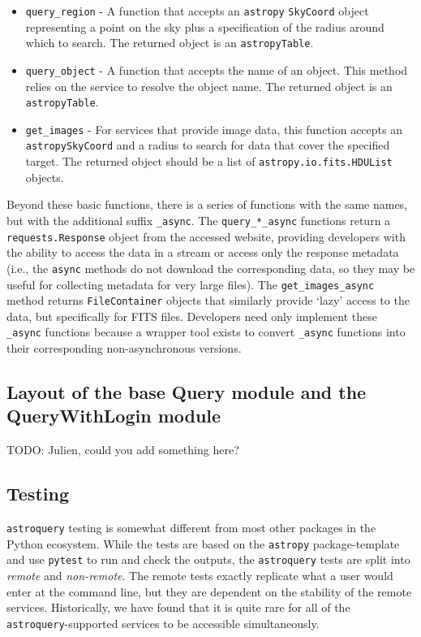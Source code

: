 \documentclass[twocolumn]{aastex61}
\newcommand{\package}[1]{\texttt{#1}\xspace}
\newcommand{\astroquery}{\package{astroquery}}
\newcommand{\astropypkg}{\package{astropy}}
\begin{document}
\begin{itemize}
    \item \texttt{query\_region} - A function that accepts an \astropypkg
        \texttt{SkyCoord} object representing a point on the sky plus a
        specification of the radius around which to search.
        The returned object is an \astropypkg \texttt{Table}.
    \item \texttt{query\_object} - A function that accepts the name of an
        object.  This method relies on the service to resolve the object name.
        The returned object is an \astropypkg \texttt{Table}.
    \item \texttt{get\_images} - For services that provide image data, this
        function accepts an \astropypkg \texttt{SkyCoord} and a radius to search for data
        that cover the specified target. The returned object should be a list
        of \texttt{astropy.io.fits.HDUList} objects.
\end{itemize}

Beyond these basic functions, there is a series of functions with the same
names, but with the additional suffix \texttt{\_async}.  The
\texttt{query\_*\_async} functions return a \texttt{requests.Response} object
from the accessed website, providing developers with
the ability to access the data in a stream or access only the response
metadata (i.e., the \texttt{async} methods do not download the corresponding
data, so they may be useful for collecting metadata for very large files).  The
\texttt{get\_images\_async} method returns
\texttt{FileContainer} objects that similarly provide `lazy' access to the
data, but specifically for FITS files.  Developers need only implement
these \texttt{\_async} functions because a wrapper tool exists to convert
\texttt{\_async} functions into their corresponding non-asynchronous versions.

\subsection{Layout of the base Query module and the QueryWithLogin module}
{\color{red}TODO: Julien, could you add something here?}

\subsection{Testing}
\astroquery testing is somewhat different from most other packages in the Python
ecosystem.  While the tests are based on the \astropypkg package-template and use
\package{pytest} to run and check the outputs, the \astroquery tests are split into
\emph{remote} and \emph{non-remote}.  The remote tests exactly replicate what a user
would enter at the command line, but they are dependent on the stability of the
remote services.  Historically, we have found that it is quite rare for all of
the \astroquery-supported services to be accessible simultaneously.
\end{document}
